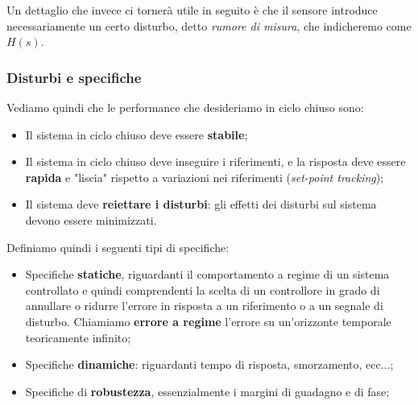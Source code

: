 \documentclass[a4paper,11pt]{article}
\begin{document}
Un dettaglio che invece ci tornerà utile in seguito è che il sensore introduce necessariamente un certo disturbo, detto \textit{rumore di misura}, che indicheremo come $H(s)$.

\subsubsection{Disturbi e specifiche}
Vediamo quindi che le performance che desideriamo in ciclo chiuso sono:
\begin{itemize}
	\item Il sistema in ciclo chiuso deve essere \textbf{stabile};
	\item Il sistema in ciclo chiuso deve inseguire i riferimenti, e la risposta deve essere \textbf{rapida} e "liscia" rispetto a variazioni nei riferimenti (\textit{set-point tracking});
	\item Il sistema deve \textbf{reiettare i disturbi}: gli effetti dei disturbi sul sistema devono essere minimizzati.
\end{itemize}

Definiamo quindi i seguenti tipi di specifiche:
\begin{itemize}
	\item Specifiche \textbf{statiche}, riguardanti il comportamento a regime di un sistema controllato e quindi comprendenti la scelta di un controllore in grado di annullare o ridurre l'errore in risposta a un riferimento o a un segnale di disturbo. Chiamiamo \textbf{errore a regime} l'errore su un'orizzonte temporale teoricamente infinito;
	\item Specifiche \textbf{dinamiche}: riguardanti tempo di risposta, smorzamento, ecc...;
	\item Specifiche di \textbf{robustezza}, essenzialmente i margini di guadagno e di fase;
\end{itemize}
\end{document}
